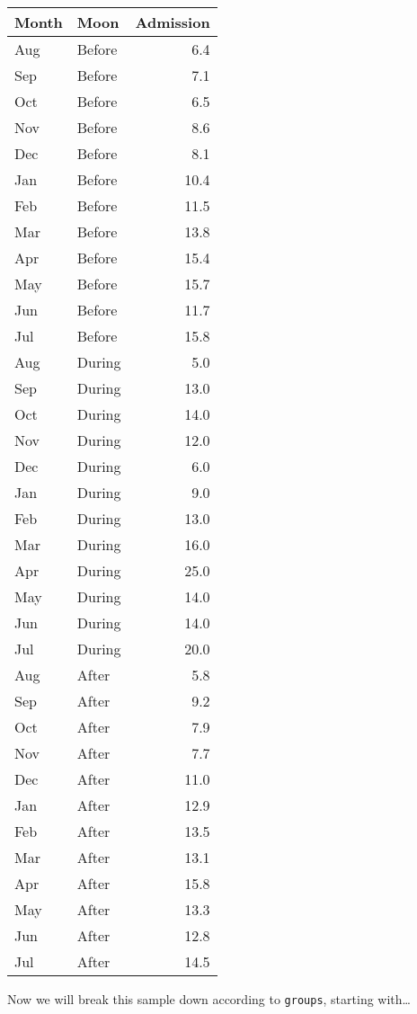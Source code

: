 \documentclass[
]{article}
\begin{document}
\begin{longtable}[]{@{}llr@{}}
\toprule\noalign{}
Month & Moon & Admission \\
\midrule\noalign{}
\endhead
\bottomrule\noalign{}
\endlastfoot
Aug & Before & 6.4 \\
Sep & Before & 7.1 \\
Oct & Before & 6.5 \\
Nov & Before & 8.6 \\
Dec & Before & 8.1 \\
Jan & Before & 10.4 \\
Feb & Before & 11.5 \\
Mar & Before & 13.8 \\
Apr & Before & 15.4 \\
May & Before & 15.7 \\
Jun & Before & 11.7 \\
Jul & Before & 15.8 \\
Aug & During & 5.0 \\
Sep & During & 13.0 \\
Oct & During & 14.0 \\
Nov & During & 12.0 \\
Dec & During & 6.0 \\
Jan & During & 9.0 \\
Feb & During & 13.0 \\
Mar & During & 16.0 \\
Apr & During & 25.0 \\
May & During & 14.0 \\
Jun & During & 14.0 \\
Jul & During & 20.0 \\
Aug & After & 5.8 \\
Sep & After & 9.2 \\
Oct & After & 7.9 \\
Nov & After & 7.7 \\
Dec & After & 11.0 \\
Jan & After & 12.9 \\
Feb & After & 13.5 \\
Mar & After & 13.1 \\
Apr & After & 15.8 \\
May & After & 13.3 \\
Jun & After & 12.8 \\
Jul & After & 14.5 \\
\end{longtable}

Now we will break this sample down according to \texttt{groups},
starting with\ldots{}
\end{document}
